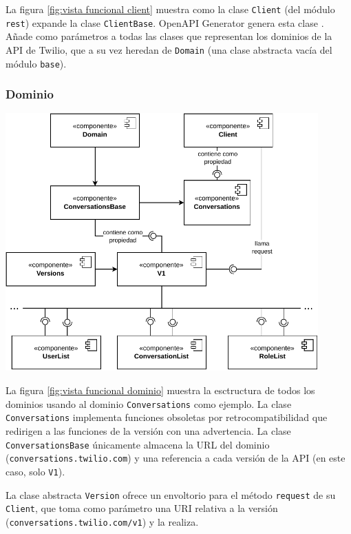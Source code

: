 \documentclass{article}
\begin{document}
\hfill

La figura \ref{fig:vista funcional client}
muestra como la clase \verb|Client|
(del módulo \verb|rest|)
expande la clase \verb|ClientBase|.
OpenAPI Generator genera esta clase
\cite{twilio-generated-openapi}.
Añade como parámetros a todas las clases
que representan los dominios de la API de Twilio,
que a su vez heredan de \verb|Domain|
(una clase abstracta vacía del módulo \verb|base|).

\subsubsection{Dominio}

\hfill

\begin{center}
  \includegraphics[width=0.9\textwidth]{VistaFuncionalDominio.pdf}
  \label{fig:vista funcional dominio}
\end{center}

\hfill

La figura \ref{fig:vista funcional dominio}
muestra la esctructura de todos los dominios
usando al dominio \verb|Conversations| como ejemplo.
La clase \verb|Conversations| implementa funciones obsoletas por retrocompatibilidad
que redirigen a las funciones de la versión con una advertencia.
La clase \verb|ConversationsBase| únicamente almacena la URL del dominio
(\verb|conversations.twilio.com|)
y una referencia a cada versión de la API
(en este caso, solo \verb|V1|).

La clase abstracta \verb|Version|
ofrece un envoltorio para el método \verb|request| de su \verb|Client|,
que toma como parámetro una URI relativa a la versión
(\verb|conversations.twilio.com/v1|)
y la realiza.
\end{document}

